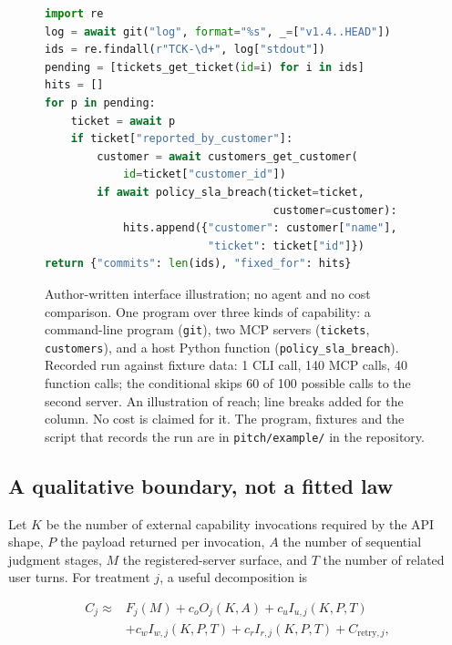 \documentclass[10pt,twocolumn]{article}
\begin{document}
\begin{figure}[t]
\begin{lstlisting}[language=Python,basicstyle=\ttfamily\scriptsize,breaklines=true,columns=fullflexible,frame=single,showstringspaces=false]
import re
log = await git("log", format="%s", _=["v1.4..HEAD"])
ids = re.findall(r"TCK-\d+", log["stdout"])
pending = [tickets_get_ticket(id=i) for i in ids]
hits = []
for p in pending:
    ticket = await p
    if ticket["reported_by_customer"]:
        customer = await customers_get_customer(
            id=ticket["customer_id"])
        if await policy_sla_breach(ticket=ticket,
                                   customer=customer):
            hits.append({"customer": customer["name"],
                         "ticket": ticket["id"]})
return {"commits": len(ids), "fixed_for": hits}
\end{lstlisting}
\caption{Author-written interface illustration; no agent and no cost
comparison.  One program over three kinds of capability: a command-line program
(\texttt{git}), two MCP servers (\texttt{tickets}, \texttt{customers}), and a
host Python function (\texttt{policy\_sla\_breach}).  Recorded run against
fixture data: 1 CLI call, 140 MCP calls, 40 function calls; the conditional
skips 60 of 100 possible calls to the second server.  An illustration of
reach; line breaks added for the column.  No cost is claimed for it.  The
program, fixtures and the script that records the run are in
\texttt{pitch/example/} in the repository.}
\label{fig:example}
\end{figure}

\subsection{A qualitative boundary, not a fitted law}

Let $K$ be the number of external capability invocations required by the API
shape, $P$ the payload returned per invocation, $A$ the number of sequential
judgment stages, $M$ the registered-server surface, and $T$ the number of
related user turns.  For treatment $j$, a useful decomposition is

\begin{align}
C_j \approx {}& F_j(M) + c_o O_j(K,A)
 + c_u I_{u,j}(K,P,T) \\
&+ c_w I_{w,j}(K,P,T) + c_r I_{r,j}(K,P,T)
 + C_{\mathrm{retry},j},
\end{align}
\end{document}
